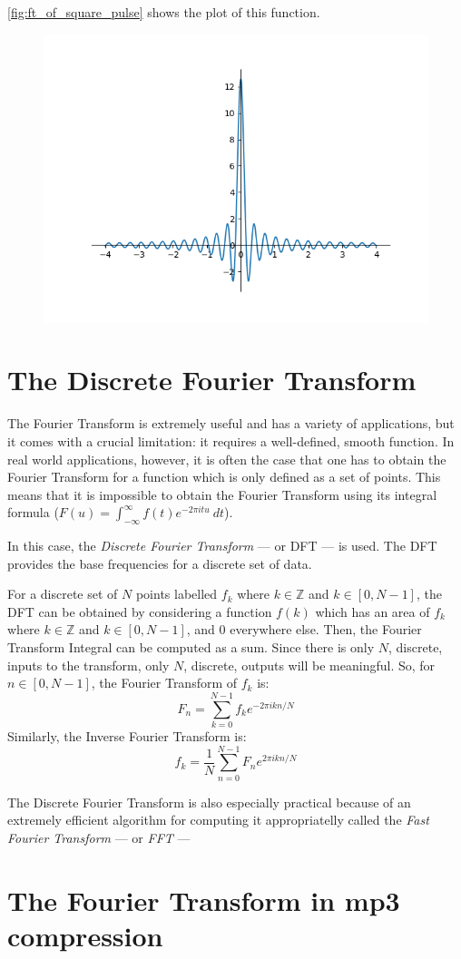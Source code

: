\documentclass [12pt, titlepage]{article}
\numberwithin{equation}{section}
\let\oldsection\section
\renewcommand\section{\clearpage\oldsection}
\newcommand{\infint}{\int_{-\infty}^{\infty}} %
\begin{document}
\autoref{fig:ft_of_square_pulse} shows the plot of this function.
\begin{figure}[H]
    \centering
    \includegraphics[width=.5\textwidth]{ft_of_square_pulse}
    \caption{}
    \label{fig:ft_of_square_pulse}
\end{figure}


\section{The Discrete Fourier Transform}

The Fourier Transform is extremely useful and has a variety of applications, but it comes
with a crucial limitation: it requires a well-defined, smooth function.
\autocite[319]{courant_calculus_2} In real world applications, however, it is often the case
that one has to obtain the Fourier Transform for a function which is only defined as a set
of points. This means that it is impossible to obtain the Fourier Transform using its
integral formula ($F(u) = \infint f(t) e^{-2\pi itu}\ dt$). 

In this case, the \emph{Discrete Fourier Transform} --- or DFT --- is used. The DFT provides
the base frequencies for a discrete set of data. 

For a discrete set of $N$ points labelled $f_k$ where $k \in \mathbb{Z}$ and $k \in [0,
N-1]$, the DFT can be obtained by considering a function $f(k)$ which has an area of $f_k$
where $k \in \mathbb{Z}$ and $k \in [0, N-1]$, and 0 everywhere else. Then, the Fourier
Transform Integral can be computed as a sum. Since there is only $N$, discrete, inputs to the
transform, only $N$, discrete, outputs will be meaningful. So, for $n \in [0, N-1]$, the
Fourier Transform of $f_k$ is:
%
\begin{equation}
    F_n = \sum_{k=0}^{N-1} f_k e^{-2\pi ikn / N}
\end{equation}
%
Similarly, the Inverse Fourier Transform is:
%
\begin{equation}
    f_k = \frac{1}{N} \sum_{n=0}^{N-1} F_n e^{2\pi ikn / N}
\end{equation}
%

The Discrete Fourier Transform is also especially practical because of an extremely
efficient algorithm for computing it appropriatelly called the \emph{Fast Fourier Transform}
--- or \emph{FFT} --- 
    
\section{The Fourier Transform in mp3 compression}



\printbibliography
\end{document}

